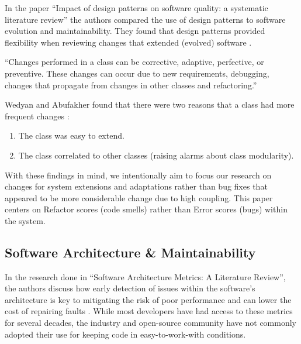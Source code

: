 In the paper ``Impact of design patterns on software quality: a systematic literature review'' the authors compared the use of design patterns to software evolution and maintainability. They found that design patterns provided flexibility when reviewing changes that extended (evolved) software \cite{wedyan:2020}.

\vspace{0.25cm}
\begin{displayquote}
  ``Changes performed in a class can be corrective, adaptive, perfective, or preventive. These changes can occur due to new requirements, debugging, changes that propagate from changes in other classes and refactoring.''
\end{displayquote}
\vspace{0.25cm}

Wedyan and Abufakher found that there were two reasons that a class had more frequent changes \cite{wedyan:2020}:

\vspace{0.25cm}
\begin{enumerate}
    \item The class was easy to extend.
    \item The class correlated to other classes (raising alarms about class modularity).
\end{enumerate}
\vspace{0.25cm}

With these findings in mind, we intentionally aim to focus our research on changes for system extensions and adaptations rather than bug fixes that appeared to be more considerable change due to high coupling. This paper centers on Refactor scores (code smells) rather than Error scores (bugs) within the system.

\subsection{Software Architecture \& Maintainability}

In the research done in ``Software Architecture Metrics: A Literature Review'', the authors discuss how early detection of issues within the software's architecture is key to mitigating the risk of poor performance and can lower the cost of repairing faults \cite{coulin:2019}. While most developers have had access to these metrics for several decades, the industry and open-source community have not commonly adopted their use for keeping code in easy-to-work-with conditions.

